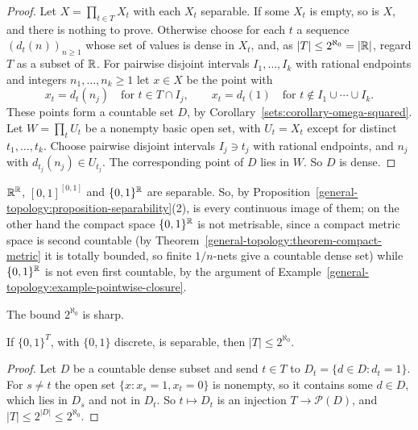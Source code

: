 \begin{proof}
Let $X = \prod_{t \in T}X_t$ with each $X_t$ separable. If some $X_t$ is empty, so is $X$, and there is nothing to prove. Otherwise choose for each $t$ a sequence $(d_t(n))_{n \geq 1}$ whose set of values is dense in
$X_t$, and, as $|T| \leq 2^{\aleph_0} = |\mathbb{R}|$, regard $T$ as a subset of $\mathbb{R}$. For pairwise disjoint intervals $I_1, \ldots, I_k$ with rational endpoints and integers $n_1, \ldots, n_k \geq 1$ let $x \in X$ be the point with
\[
x_t = d_t(n_j) \quad \text{for } t \in T \cap I_j, \qquad x_t = d_t(1) \quad \text{for } t \notin I_1 \cup \cdots \cup I_k .
\]
These points form a countable set $D$, by Corollary~\ref{sets:corollary-omega-squared}. Let $W = \prod_tU_t$ be a nonempty basic open set, with $U_t = X_t$ except for distinct $t_1, \ldots, t_k$. Choose
pairwise disjoint intervals $I_j \ni t_j$ with rational endpoints, and $n_j$ with $d_{t_j}(n_j) \in U_{t_j}$. The corresponding point of $D$ lies in $W$. So $D$ is dense.
\end{proof}

\begin{example}\label{general-topology:example-hmp}
$\mathbb{R}^{\mathbb{R}}$, $[0, 1]^{[0, 1]}$ and $\{0, 1\}^{\mathbb{R}}$ are separable. So, by Proposition~\ref{general-topology:proposition-separability}(2), is every continuous image of them; on the other hand the compact space
$\{0, 1\}^{\mathbb{R}}$ is not metrisable, since a compact metric space is second countable (by Theorem~\ref{general-topology:theorem-compact-metric} it is totally bounded, so finite $1/n$-nets give a countable dense set)
while $\{0, 1\}^{\mathbb{R}}$ is not even first countable, by the argument of Example~\ref{general-topology:example-pointwise-closure}.
\end{example}

The bound $2^{\aleph_0}$ is sharp.

\begin{proposition}\label{general-topology:proposition-hmp-sharp}
If $\{0, 1\}^T$, with $\{0, 1\}$ discrete, is separable, then $|T| \leq 2^{\aleph_0}$.
\end{proposition}

\begin{proof}
Let $D$ be a countable dense subset and send $t \in T$ to $D_t = \{d \in D : d_t = 1\}$. For $s \neq t$ the open set $\{x : x_s = 1, x_t = 0\}$ is nonempty, so it contains some $d \in D$, which lies in $D_s$ and not in
$D_t$. So $t \mapsto D_t$ is an injection $T \to \mathcal{P}(D)$, and $|T| \leq 2^{|D|} \leq 2^{\aleph_0}$.
\end{proof}

